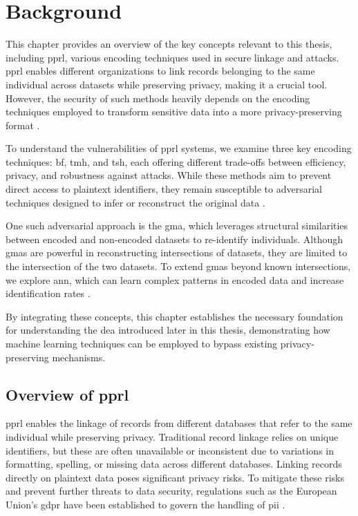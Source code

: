 \chapter{Background}  \label{sec:background}

This chapter provides an overview of the key concepts relevant to this thesis, including \ac{pprl}, various encoding techniques used in secure linkage and attacks.
\ac{pprl} enables different organizations to link records belonging to the same individual across datasets while preserving privacy, making it a crucial tool.
However, the security of such methods heavily depends on the encoding techniques employed to transform sensitive data into a more privacy-preserving format \cite{vidanage2020graph}.

To understand the vulnerabilities of \ac{pprl} systems, we examine three key encoding techniques: \ac{bf}, \ac{tmh}, and \ac{tsh}, each offering different trade-offs between efficiency, privacy, and robustness against attacks.
While these methods aim to prevent direct access to plaintext identifiers, they remain susceptible to adversarial techniques designed to infer or reconstruct the original data \cite{vidanage2020graph,schaefer2024}.

One such adversarial approach is the \ac{gma}, which leverages structural similarities between encoded and non-encoded datasets to re-identify individuals.
Although \ac{gma}s are powerful in reconstructing intersections of datasets, they are limited to the intersection of the two datasets.
To extend \ac{gma}s beyond known intersections, we explore \ac{ann}, which can learn complex patterns in encoded data and increase identification rates \cite{schaefer2024,vidanage2020graph}.

By integrating these concepts, this chapter establishes the necessary foundation for understanding the \ac{dea} introduced later in this thesis, demonstrating how machine learning techniques can be employed to bypass existing privacy-preserving mechanisms.

\section{Overview of \ac{pprl} }\label{sec:pprl_overview}

\ac{pprl} enables the linkage of records from different databases that refer to the same individual while preserving privacy.
Traditional record linkage relies on unique identifiers, but these are often unavailable or inconsistent due to variations in formatting, spelling, or missing data across different databases.
Linking records directly on plaintext data poses significant privacy risks.
To mitigate these risks and prevent further threats to data security, regulations such as the European Union's \ac{gdpr} have been established to govern the handling of \ac{pii} \cite{schaefer2024,vidanage2020graph}.

